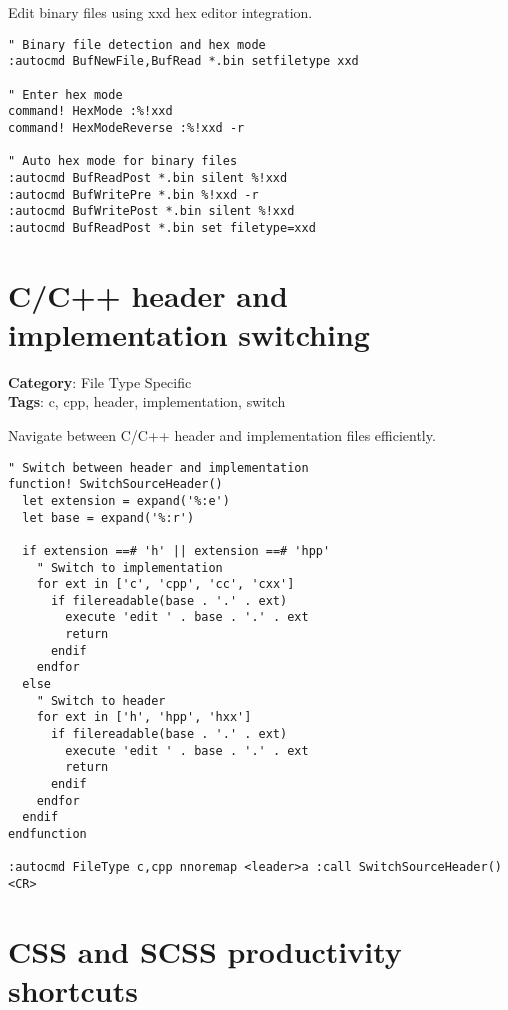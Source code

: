 {{{{{Edit binary files using xxd hex editor integration.

\begin{Exa*}{}
\begin{Verbatim}[fontsize=\footnotesize, breaklines, breakanywhere]
" Binary file detection and hex mode
:autocmd BufNewFile,BufRead *.bin setfiletype xxd

" Enter hex mode
command! HexMode :%!xxd
command! HexModeReverse :%!xxd -r

" Auto hex mode for binary files
:autocmd BufReadPost *.bin silent %!xxd
:autocmd BufWritePre *.bin %!xxd -r
:autocmd BufWritePost *.bin silent %!xxd
:autocmd BufReadPost *.bin set filetype=xxd
\end{Verbatim}
\end{Exa*}

\section{C/C++ header and implementation switching}

\textbf{Category}: File Type Specific\\ \textbf{Tags}: c, cpp, header, implementation, switch
\vspace{0.5cm}

Navigate between C/C++ header and implementation files efficiently.

\begin{Exa*}{}
\begin{Verbatim}[fontsize=\footnotesize, breaklines, breakanywhere]
" Switch between header and implementation
function! SwitchSourceHeader()
  let extension = expand('%:e')
  let base = expand('%:r')
  
  if extension ==# 'h' || extension ==# 'hpp'
    " Switch to implementation
    for ext in ['c', 'cpp', 'cc', 'cxx']
      if filereadable(base . '.' . ext)
        execute 'edit ' . base . '.' . ext
        return
      endif
    endfor
  else
    " Switch to header
    for ext in ['h', 'hpp', 'hxx']
      if filereadable(base . '.' . ext)
        execute 'edit ' . base . '.' . ext
        return
      endif
    endfor
  endif
endfunction

:autocmd FileType c,cpp nnoremap <leader>a :call SwitchSourceHeader()<CR>
\end{Verbatim}
\end{Exa*}

\section{CSS and SCSS productivity shortcuts}

}}}}}
